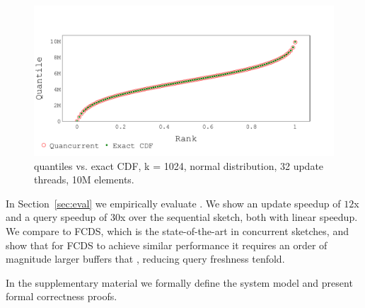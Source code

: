 \begin{figure}[htp]
    \centering
    \includegraphics[width=\linewidth,trim={0cm 0.3cm 0cm 1.5cm},clip]
    {graphics/graphs/accuracy/Oracle_Quancurrent_blocking_numa_cdf_normal_k1024_b16_keys10M_runs1_uT32_qT1_snapshot1_15-08-2022_07-15-13.pdf}
    \caption{\mysketch quantiles vs. exact CDF, k = 1024, normal distribution, 32 update threads, 10M elements.}
    \label{fig:intro-query-accuracy}
\end{figure}


In Section~\ref{sec:eval} we empirically evaluate \mysketch. We show an update speedup of $12$x and a query speedup of $30$x over the sequential sketch, both with linear speedup. We compare \mysketch to FCDS, which is the state-of-the-art in concurrent sketches, and show that for FCDS to achieve similar performance it requires an order of magnitude larger buffers that \mysketch, reducing query freshness tenfold.

In the supplementary material we formally define the system model and present formal correctness proofs.

